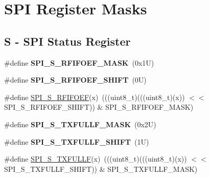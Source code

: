 \hypertarget{group___s_p_i___register___masks}{}\section{S\+PI Register Masks}
\label{group___s_p_i___register___masks}
\subsection*{S -\/ S\+PI Status Register}
\begin{DoxyCompactItemize}
\item 
\mbox{\label{group___s_p_i___register___masks_ga4764710c6b19d8e403dcbf01a5c2bccc}} 
\#define {\bfseries S\+P\+I\+\_\+\+S\+\_\+\+R\+F\+I\+F\+O\+E\+F\+\_\+\+M\+A\+SK}~(0x1\+U)
\item 
\mbox{\label{group___s_p_i___register___masks_gad1cbbcc1cc0366cbb2de91ab7a6890ea}} 
\#define {\bfseries S\+P\+I\+\_\+\+S\+\_\+\+R\+F\+I\+F\+O\+E\+F\+\_\+\+S\+H\+I\+FT}~(0\+U)
\item 
\#define \mbox{\hyperlink{group___s_p_i___register___masks_ga886063ef320cce5784b42990f1854080}{S\+P\+I\+\_\+\+S\+\_\+\+R\+F\+I\+F\+O\+EF}}(x)~(((uint8\+\_\+t)(((uint8\+\_\+t)(x)) $<$$<$ S\+P\+I\+\_\+\+S\+\_\+\+R\+F\+I\+F\+O\+E\+F\+\_\+\+S\+H\+I\+FT)) \& S\+P\+I\+\_\+\+S\+\_\+\+R\+F\+I\+F\+O\+E\+F\+\_\+\+M\+A\+SK)
\item 
\mbox{\label{group___s_p_i___register___masks_gaf9f3a70e870f08913bedfb6fc81d254e}} 
\#define {\bfseries S\+P\+I\+\_\+\+S\+\_\+\+T\+X\+F\+U\+L\+L\+F\+\_\+\+M\+A\+SK}~(0x2\+U)
\item 
\mbox{\label{group___s_p_i___register___masks_ga8c21cd40c23db58031f63eb77de97bc8}} 
\#define {\bfseries S\+P\+I\+\_\+\+S\+\_\+\+T\+X\+F\+U\+L\+L\+F\+\_\+\+S\+H\+I\+FT}~(1\+U)
\item 
\#define \mbox{\hyperlink{group___s_p_i___register___masks_gab9b7497d0e4ff8bbd1db373bab6159a2}{S\+P\+I\+\_\+\+S\+\_\+\+T\+X\+F\+U\+L\+LF}}(x)~(((uint8\+\_\+t)(((uint8\+\_\+t)(x)) $<$$<$ S\+P\+I\+\_\+\+S\+\_\+\+T\+X\+F\+U\+L\+L\+F\+\_\+\+S\+H\+I\+FT)) \& S\+P\+I\+\_\+\+S\+\_\+\+T\+X\+F\+U\+L\+L\+F\+\_\+\+M\+A\+SK)
\item 
\mbox{\label{group___s_p_i___register___masks_gaf97800bbb6ab3322fab3eb4bb576e7a4}} 

\end{DoxyCompactItemize}
